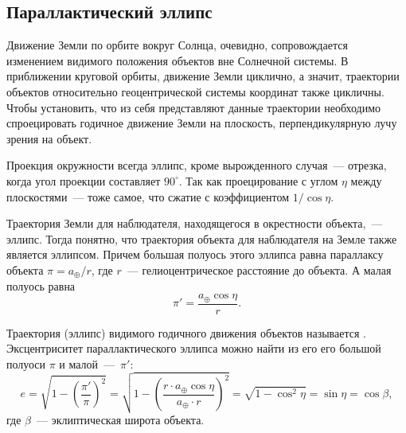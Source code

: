 \subsection{Параллактический эллипс}
Движение Земли по орбите вокруг Солнца, очевидно, сопровождается изменением видимого положения объектов вне Солнечной системы. В приближении круговой орбиты, движение Земли циклично, а значит, траектории объектов относительно геоцентрической системы координат также цикличны. Чтобы установить, что из себя представляют данные траектории необходимо спроецировать годичное движение Земли на плоскость, перпендикулярную лучу зрения на объект.

Проекция окружности всегда эллипс, кроме вырожденного случая~--- отрезка, когда угол проекции составляет $90^\circ$. Так как проецирование с углом $\eta$ между плоскостями~--- тоже самое, что сжатие с коэффициентом $1/\cos\eta$.

Траектория Земли для наблюдателя, находящегося в окрестности объекта,~--- эллипс. Тогда понятно, что траектория объекта для наблюдателя на Земле также является эллипсом. Причем большая полуось этого эллипса равна параллаксу объекта $\pi = a_\oplus / r$, где $r$~--- гелиоцентрическое расстояние до объекта. А малая полуось равна
\begin{equation*}
	\pi' = \frac{a_\oplus \cos \eta}{r}.
\end{equation*}

\begin{figure}[h!]
	\centering
	\caption{}
\end{figure}

Траектория (эллипс) видимого годичного движения объектов называется . Эксцентриситет параллактического эллипса можно найти из его его большой полуоси $\pi$ и малой~---~$\pi'$:
\begin{equation*}
	e 
	= \sqrt{1 - \left(\frac{\pi'}{\pi} \right)^2} 
	= \sqrt{1 - \left( \frac{r \cdot a_\oplus \cos \eta}{a_\oplus \cdot r}\right)^2} 
	= \sqrt{1 - \cos^2 \eta} = \sin \eta = \cos \beta,
\end{equation*}
где $\beta$~--- эклиптическая широта объекта.


